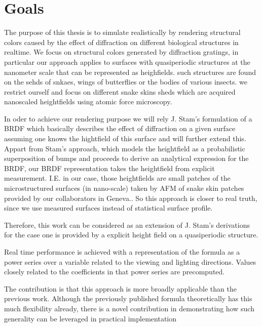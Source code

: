 \section{Goals}
The purpose of this thesis is to simulate realistically by rendering structural colors caused by the effect of diffraction on different biological structures in realtime. We focus on structural colors generated by diffraction gratings, in particular our approach applies to surfaces with quasiperiodic structures at the nanometer scale that can be represented as heighfields. such structures are found on the sehds of snkaes, wings of butterflies or the bodies of various insects. we restrict ourself and focus on different snake skins sheds which are acquired nanoscaled heightfields using atomic force microscopy. 

In oder to achieve our rendering purpose we will rely J. Stam's formulation of a BRDF which basically describes the effect of diffraction on a given surface assuming one knows the hightfield of this surface and will further extend this. Appart from Stam's approach, which models the heightfield as a probabilistic superposition of bumps and proceeds to derive an analytical expression for the BRDF, our BRDF representation takes the heightfield from explicit measurement. 
I.E. in our case, those heightfields are small patches of the microstructured surfaces (in nano-scale) taken by AFM of snake skin patches provided by our collaborators in Geneva..
So this approach is closer to real truth, since we use measured surfaces instead of statistical surface profile.

Therefore, this work can be considered as an extension of J. Stam's derivations for the case one is provided by a explicit height field on a quasiperiodic structure.

Real time performance is achieved with a representation of the formula as a power series over a variable related to the viewing and lighting directions. Values closely related to the coefficients in that power series are precomputed.

The contribution is that this approach is more broadly applicable than the previous work. Although the previously published formula theoretically has this much flexibility already, there is a novel contribution in demonstrating how such generality can be leveraged in practical implementation


